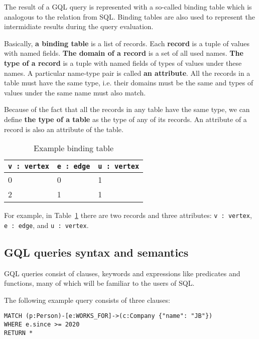 \documentclass[14pt]{constructor-thesis}
\theoremstyle{definition}
\begin{document}
The result of a GQL query is represented with a so-called binding table which is analogous to the relation from SQL. Binding tables are also used to represent the intermidiate results during the query evaluation.

Basically, \textbf{a binding table} is a list of records. Each \textbf{record} is a tuple of values with named fields. \textbf{The domain of a record} is a set of all used names. \textbf{The type of a record} is a tuple with named fields of types of values under these names. A particular name-type pair is called \textbf{an attribute}. All the records in a table must have the same type, i.e. their domains must be the same and types of values under the same name must also match.

Because of the fact that all the records in any table have the same type, we can define \textbf{the type of a table} as the type of any of its records. An attribute of a record is also an attribute of the table.

\begin{table}
  \centering
  
  \begin{tabular}{ |p{3cm}|p{3cm}|p{3cm}|  }
    \hline
    \texttt{v : vertex} & \texttt{e : edge} & \texttt{u : vertex} \\
    \hline
    0 & 0 & 1 \\
    2 & 1 & 1 \\
    \hline
  \end{tabular}

  \caption{Example binding table}
  \label{tab:example-binding-table}
\end{table}

For example, in Table~\ref{tab:example-binding-table} there are two records and three attributes: \texttt{v : vertex}, \texttt{e : edge}, and \texttt{u : vertex}. 


\subsection{GQL queries syntax and semantics}
\label{section:intro-GQL}

GQL queries consist of clauses, keywords and expressions like predicates and functions, many of which will be familiar to the users of SQL.


The following example query consists of three clauses:
\begin{verbatim}
MATCH (p:Person)-[e:WORKS_FOR]->(c:Company {"name": "JB"})
WHERE e.since >= 2020
RETURN *
\end{verbatim}
\end{document}
